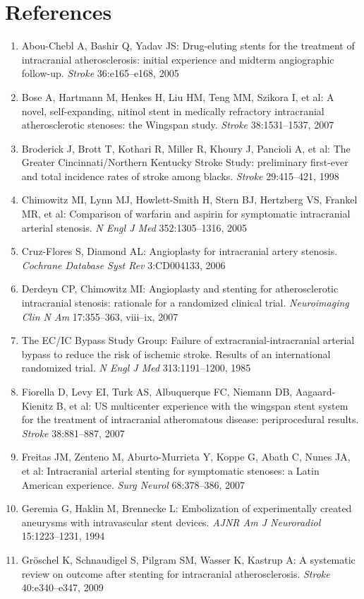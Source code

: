 \documentclass{article}
\begin{document}
\section{References}

\begin{enumerate}
\item Abou-Chebl A, Bashir Q, Yadav JS: Drug-eluting stents for the treatment of intracranial atherosclerosis: initial experience and midterm angiographic follow-up. \textit{Stroke} 36:e165–e168, 2005
\item Bose A, Hartmann M, Henkes H, Liu HM, Teng MM, Szikora I, et al: A novel, self-expanding, nitinol stent in medically refractory intracranial atherosclerotic stenoses: the Wingspan study. \textit{Stroke} 38:1531–1537, 2007
\item Broderick J, Brott T, Kothari R, Miller R, Khoury J, Pancioli A, et al: The Greater Cincinnati/Northern Kentucky Stroke Study: preliminary first-ever and total incidence rates of stroke among blacks. \textit{Stroke} 29:415–421, 1998
\item Chimowitz MI, Lynn MJ, Howlett-Smith H, Stern BJ, Hertzberg VS, Frankel MR, et al: Comparison of warfarin and aspirin for symptomatic intracranial arterial stenosis. \textit{N Engl J Med} 352:1305–1316, 2005
\item Cruz-Flores S, Diamond AL: Angioplasty for intracranial artery stenosis. \textit{Cochrane Database Syst Rev} 3:CD004133, 2006
\item Derdeyn CP, Chimowitz MI: Angioplasty and stenting for atherosclerotic intracranial stenosis: rationale for a randomized clinical trial. \textit{Neuroimaging Clin N Am} 17:355–363, viii–ix, 2007
\item The EC/IC Bypass Study Group: Failure of extracranial-intracranial arterial bypass to reduce the risk of ischemic stroke. Results of an international randomized trial. \textit{N Engl J Med} 313:1191–1200, 1985
\item Fiorella D, Levy EI, Turk AS, Albuquerque FC, Niemann DB, Aagaard-Kienitz B, et al: US multicenter experience with the wingspan stent system for the treatment of intracranial atheromatous disease: periprocedural results. \textit{Stroke} 38:881–887, 2007
\item Freitas JM, Zenteno M, Aburto-Murrieta Y, Koppe G, Abath C, Nunes JA, et al: Intracranial arterial stenting for symptomatic stenoses: a Latin American experience. \textit{Surg Neurol} 68:378–386, 2007
\item Geremia G, Haklin M, Brennecke L: Embolization of experimentally created aneurysms with intravascular stent devices. \textit{AJNR Am J Neuroradiol} 15:1223–1231, 1994
\item Gröschel K, Schnaudigel S, Pilgram SM, Wasser K, Kastrup A: A systematic review on outcome after stenting for intracranial atherosclerosis. \textit{Stroke} 40:e340–e347, 2009

\end{enumerate}
\end{document}
